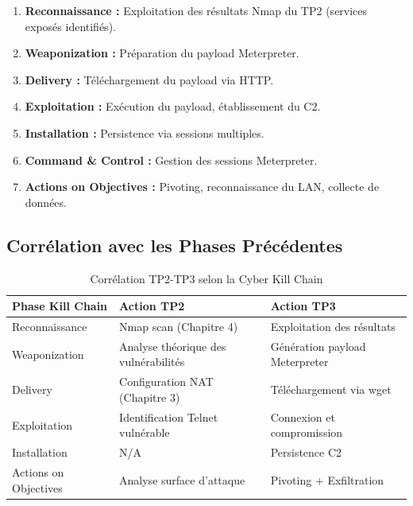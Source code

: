 \documentclass[12pt,a4paper,openany]{report}
\newcommand{\tableheadcolor}{\rowcolor{tableheadbg}}
\begin{document}
	\begin{enumerate}
		\item \textbf{Reconnaissance :} Exploitation des résultats Nmap du TP2 (services exposés identifiés).
		\item \textbf{Weaponization :} Préparation du payload Meterpreter.
		\item \textbf{Delivery :} Téléchargement du payload via HTTP.
		\item \textbf{Exploitation :} Exécution du payload, établissement du C2.
		\item \textbf{Installation :} Persistence via sessions multiples.
		\item \textbf{Command \& Control :} Gestion des sessions Meterpreter.
		\item \textbf{Actions on Objectives :} Pivoting, reconnaissance du LAN, collecte de données.
	\end{enumerate}
	
	\subsection{Corrélation avec les Phases Précédentes}
	
	\begin{table}[H]
		\centering
		\small
		\renewcommand{\arraystretch}{1.4}
		\setlength{\arrayrulewidth}{0.5pt}
		\begin{tabular}{p{3.5cm} p{5cm} p{4.5cm}}
			\arrayrulecolor{tableborder}
			\hline
			\tableheadcolor
			\textcolor{tableheadfg}{\textbf{Phase Kill Chain}} &
			\textcolor{tableheadfg}{\textbf{Action TP2}} &
			\textcolor{tableheadfg}{\textbf{Action TP3}} \\
			\hline
			\rowcolor{tablerowalt}
			Reconnaissance & Nmap scan (Chapitre 4) & Exploitation des résultats \\
			Weaponization & Analyse théorique des vulnérabilités & Génération payload Meterpreter \\
			\rowcolor{tablerowalt}
			Delivery & Configuration NAT (Chapitre 3) & Téléchargement via wget \\
			Exploitation & Identification Telnet vulnérable & Connexion et compromission \\
			\rowcolor{tablerowalt}
			Installation & N/A & Persistence C2 \\
			Actions on Objectives & Analyse surface d'attaque & Pivoting + Exfiltration \\
			\hline
		\end{tabular}
		\caption{Corrélation TP2-TP3 selon la Cyber Kill Chain}
		\label{tab:kill-chain-correlation}
	\end{table}
	
\end{document}

